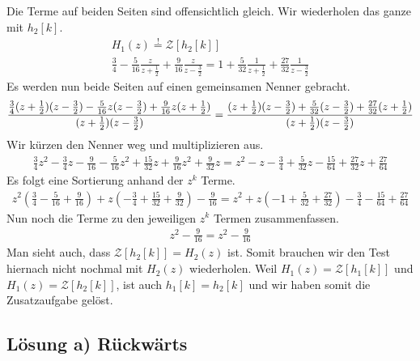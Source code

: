 \documentclass[11pt,a4paper,DIV=12]{scrartcl}
\begin{document}
%
%
Die Terme auf beiden Seiten sind offensichtlich gleich.
%
Wir wiederholen das ganze mit $h_2[k]$.
%
%
\begin{gather}
	H_1(z)\overset{!}{=}\mathcal{Z}\left[h_2[k]\right]\\
	\frac{3}{4}-\frac{5}{16}\frac{z}{z+\frac{1}{2}}+\frac{9}{16}\frac{z}{z-\frac{3}{2}}
	=1+\frac{5}{32}\frac{1}{z+\frac{1}{2}}+\frac{27}{32}\frac{1}{z-\frac{3}{2}}
\end{gather}
%
%
Es werden nun beide Seiten auf einen gemeinsamen Nenner gebracht.
%
%
\begin{gather}
	\frac{
		\frac{3}{4}(z+\frac{1}{2})(z-\frac{3}{2})-\frac{5}{16}z(z-\frac{3}{2})+\frac{9}{16}z(z+\frac{1}{2})
	}
	{
		(z+\frac{1}{2})(z-\frac{3}{2})
	}
	=\frac{
		(z+\frac{1}{2})(z-\frac{3}{2})+\frac{5}{32}(z-\frac{3}{2})+\frac{27}{32}(z+\frac{1}{2})
	}
	{
		(z+\frac{1}{2})(z-\frac{3}{2})
	}
\end{gather}
%
%
Wir kürzen den Nenner weg und multiplizieren aus.
%
%
\begin{gather}
	\frac{3}{4}z^2-\frac{3}{4}z-\frac{9}{16}-\frac{5}{16}z^2+\frac{15}{32}z+\frac{9}{16}z^2+\frac{9}{32}z
	=z^2-z-\frac{3}{4}+\frac{5}{32}z-\frac{15}{64}+\frac{27}{32}z+\frac{27}{64}
\end{gather}
%
%
Es folgt eine Sortierung anhand der $z^k$ Terme.
%
%
\begin{gather}
	z^2(\frac{3}{4}-\frac{5}{16}+\frac{9}{16})+z(-\frac{3}{4}+\frac{15}{32}+\frac{9}{32})-\frac{9}{16}
	=z^2+z(-1+\frac{5}{32}+\frac{27}{32})-\frac{3}{4}-\frac{15}{64}+\frac{27}{64}
\end{gather}
%
%
Nun noch die Terme zu den jeweiligen $z^k$ Termen zusammenfassen.
%
\begin{gather}
	z^2-\frac{9}{16}=z^2-\frac{9}{16}
\end{gather}
%
Man sieht auch, dass $\mathcal{Z}\left[h_2[k]\right]=H_2(z)$ ist.
%
Somit brauchen wir den Test hiernach nicht nochmal mit $H_2(z)$ wiederholen.
%
Weil $H_1(z)=\mathcal{Z}\left[h_1[k]\right]$ und
$H_1(z)=\mathcal{Z}\left[h_2[k]\right]$, ist auch $h_1[k]=h_2[k]$ und wir haben
somit die Zusatzaufgabe gelöst.\\
%
\newpage
\subsection*{Lösung a) Rückwärts}
\end{document}

